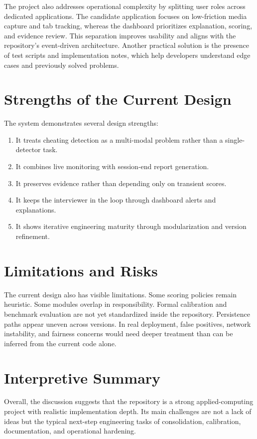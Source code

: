 \documentclass[12pt,a4paper]{extreport}
\begin{document}
The project also addresses operational complexity by splitting user roles across dedicated applications. The candidate application focuses on low-friction media capture and tab tracking, whereas the dashboard prioritizes explanation, scoring, and evidence review. This separation improves usability and aligns with the repository's event-driven architecture. Another practical solution is the presence of test scripts and implementation notes, which help developers understand edge cases and previously solved problems.

\section{Strengths of the Current Design}
The system demonstrates several design strengths:
\begin{enumerate}
  \item It treats cheating detection as a multi-modal problem rather than a single-detector task.
  \item It combines live monitoring with session-end report generation.
  \item It preserves evidence rather than depending only on transient scores.
  \item It keeps the interviewer in the loop through dashboard alerts and explanations.
  \item It shows iterative engineering maturity through modularization and version refinement.
\end{enumerate}

\section{Limitations and Risks}
The current design also has visible limitations. Some scoring policies remain heuristic. Some modules overlap in responsibility. Formal calibration and benchmark evaluation are not yet standardized inside the repository. Persistence paths appear uneven across versions. In real deployment, false positives, network instability, and fairness concerns would need deeper treatment than can be inferred from the current code alone.

\section{Interpretive Summary}
Overall, the discussion suggests that the repository is a strong applied-computing project with realistic implementation depth. Its main challenges are not a lack of ideas but the typical next-step engineering tasks of consolidation, calibration, documentation, and operational hardening.
\end{document}
